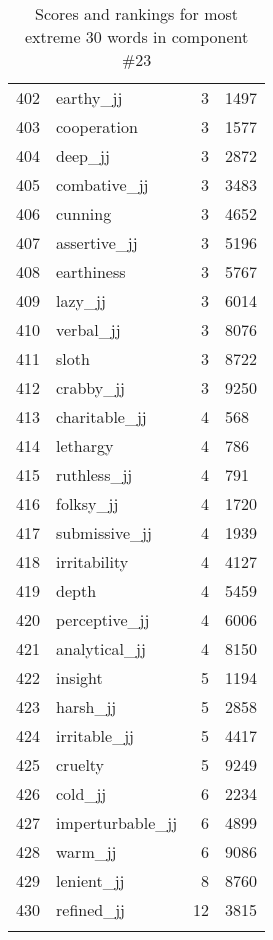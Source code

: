 \begin{longtable}[!htbp]{| rlr@{.}l |}
    402 & earthy\_jj & 3 & 1497 \\
    403 & cooperation & 3 & 1577 \\
    404 & deep\_jj & 3 & 2872 \\
    405 & combative\_jj & 3 & 3483 \\
    406 & cunning & 3 & 4652 \\
    407 & assertive\_jj & 3 & 5196 \\
    408 & earthiness & 3 & 5767 \\
    409 & lazy\_jj & 3 & 6014 \\
    410 & verbal\_jj & 3 & 8076 \\
    411 & sloth & 3 & 8722 \\
    412 & crabby\_jj & 3 & 9250 \\
    413 & charitable\_jj & 4 & 568 \\
    414 & lethargy & 4 & 786 \\
    415 & ruthless\_jj & 4 & 791 \\
    416 & folksy\_jj & 4 & 1720 \\
    417 & submissive\_jj & 4 & 1939 \\
    418 & irritability & 4 & 4127 \\
    419 & depth & 4 & 5459 \\
    420 & perceptive\_jj & 4 & 6006 \\
    421 & analytical\_jj & 4 & 8150 \\
    422 & insight & 5 & 1194 \\
    423 & harsh\_jj & 5 & 2858 \\
    424 & irritable\_jj & 5 & 4417 \\
    425 & cruelty & 5 & 9249 \\
    426 & cold\_jj & 6 & 2234 \\
    427 & imperturbable\_jj & 6 & 4899 \\
    428 & warm\_jj & 6 & 9086 \\
    429 & lenient\_jj & 8 & 8760 \\
    430 & refined\_jj & 12 & 3815 \\
    \hline
    \caption{Scores and rankings for most extreme 30 words in component \#23} \\
\end{longtable}
